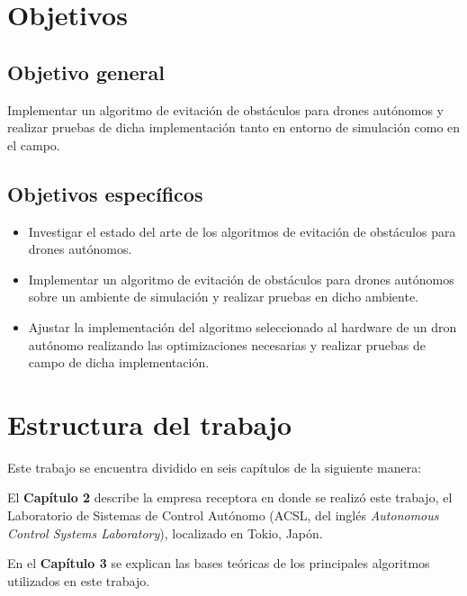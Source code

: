    
\section{Objetivos}

    \subsection{Objetivo general}
    
    Implementar un algoritmo de evitación de obstáculos para drones autónomos y realizar
    pruebas de dicha implementación tanto en entorno de simulación como en el campo.
    
    \subsection{Objetivos específicos}
    
    \begin{itemize}
        \item Investigar el estado del arte de los algoritmos de evitación de obstáculos para drones autónomos.
        \item Implementar un algoritmo de evitación de obstáculos para drones autónomos sobre un ambiente de simulación y realizar pruebas en dicho ambiente.
        \item Ajustar la implementación del algoritmo seleccionado al hardware de un dron autónomo realizando las optimizaciones necesarias y realizar pruebas de campo de dicha implementación.
    \end{itemize}

\section{Estructura del trabajo}

    \par Este trabajo se encuentra dividido en seis capítulos de la siguiente manera:
    
    \par El \textbf{Capítulo 2} describe la empresa receptora en donde se realizó este trabajo, el Laboratorio de Sistemas de Control Autónomo (ACSL, del inglés \textit{Autonomous Control Systems Laboratory}), localizado en Tokio, Japón. 
    
    \par En el \textbf{Capítulo 3} se explican las bases teóricas de los principales algoritmos utilizados en este trabajo. 
    
